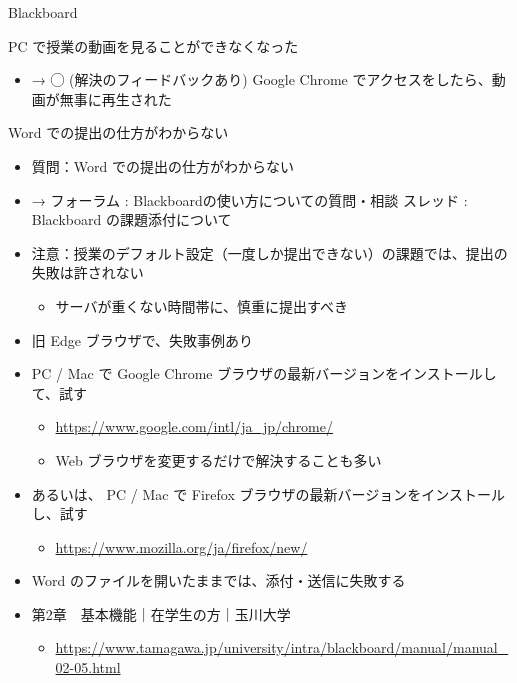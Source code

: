 \documentclass[a4j,10pt]{jsarticle}
\begin{document}
{\begin{frame}[label={sec:org166405d},fragile]{Blackboard}
\begin{block}{PC で授業の動画を見ることができなくなった}
\begin{itemize}
\begin{itemize}
\par
\item → ◯ (解決のフィードバックあり) Google Chrome でアクセスをしたら、動画が無事に再生された
\end{itemize}
\end{itemize}
\end{block}
\par
\begin{block}{Word での提出の仕方がわからない}
\begin{itemize}
\item 質問：Word での提出の仕方がわからない
\par
\item → フォーラム : Blackboardの使い方についての質問・相談 スレッド : Blackboard の課題添付について
\par
\item 注意：授業のデフォルト設定（一度しか提出できない）の課題では、提出の失敗は許されない
\begin{itemize}
\item サーバが重くない時間帯に、慎重に提出すべき
\end{itemize}
\par
\item 旧 Edge ブラウザで、失敗事例あり
\par
\item PC / Mac で Google Chrome ブラウザの最新バージョンをインストールして、試す
\begin{itemize}
\item \url{https://www.google.com/intl/ja\_jp/chrome/}
\item Web ブラウザを変更するだけで解決することも多い
\end{itemize}
\par
\item あるいは、 PC / Mac で Firefox ブラウザの最新バージョンをインストールし、試す
\begin{itemize}
\item \url{https://www.mozilla.org/ja/firefox/new/}
\end{itemize}
\par
\item Word のファイルを開いたままでは、添付・送信に失敗する
\par
\item 第2章　基本機能｜在学生の方｜玉川大学
\begin{itemize}
\item \url{https://www.tamagawa.jp/university/intra/blackboard/manual/manual\_02-05.html}
\end{itemize}

\end{itemize}
\end{block}
\end{frame}}
\end{document}
